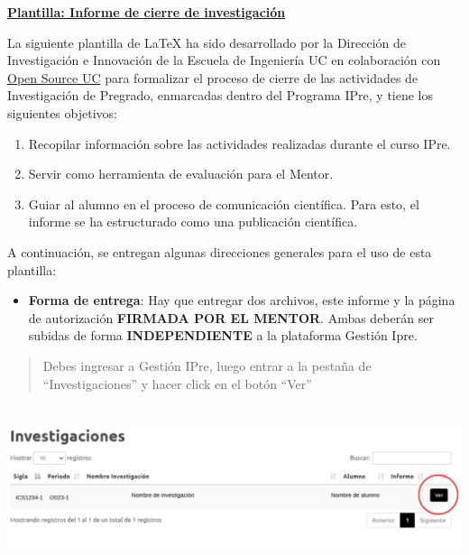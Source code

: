 \begin{center}
{\LARGE\bfseries\underline{Plantilla: Informe de cierre de investigación}}
\end{center}\vspace{4ex}

La siguiente plantilla de \LaTeX{} ha sido desarrollado por la Dirección de Investigación e Innovación de la Escuela de Ingeniería UC en colaboración con \href{https://osuc.dev/}{Open Source UC} para formalizar el proceso de cierre de las actividades de Investigación de Pregrado, enmarcadas dentro del Programa IPre, y tiene los siguientes objetivos:

\begin{enumerate}
  \item Recopilar información sobre las actividades realizadas durante el curso IPre.
  \item Servir como herramienta de evaluación para el Mentor.
  \item Guiar al alumno en el proceso de comunicación científica. Para esto, el informe se ha estructurado como una publicación científica.
\end{enumerate}

A continuación, se entregan algunas direcciones generales para el uso de esta plantilla:

\begin{itemize}
  \item \textbf{Forma de entrega}: Hay que entregar dos archivos, este informe y la página de autorización \textbf{FIRMADA POR EL MENTOR}. Ambas deberán ser subidas de forma \textbf{INDEPENDIENTE} a la plataforma Gestión Ipre.
\end{itemize}

\begin{quote}
Debes ingresar a Gestión IPre, luego entrar a la pestaña de ``Investigaciones'' y hacer click en el botón ``Ver''
\end{quote}

\includegraphics[width=6.13687in,height=1.85393in]{img/Imagen_1.png}

